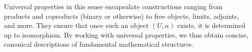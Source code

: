 \documentclass{article}
\begin{document}
Universal properties in this sense encapsulate constructions ranging from products and coproducts (binary or otherwise) to free objects, limits, adjoints, and more. They ensure that once such an object \((U, \alpha)\) exists, it is determined up to isomorphism. By working with universal properties, we thus obtain concise, canonical descriptions of fundamental mathematical structures.


\end{document}
